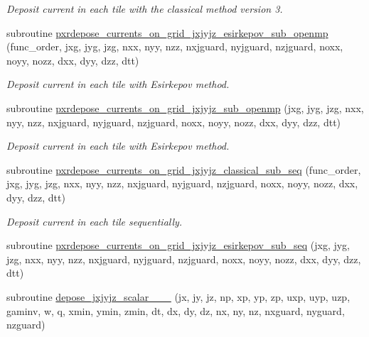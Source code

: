 \begin{DoxyCompactItemize}
\begin{DoxyCompactList}\small\item\em Deposit current in each tile with the classical method version 3. \end{DoxyCompactList}\item 
subroutine \hyperlink{current__deposition_8_f90_ae617423f1f21cbacb686a291c6b0ad7b}{pxrdepose\+\_\+currents\+\_\+on\+\_\+grid\+\_\+jxjyjz\+\_\+esirkepov\+\_\+sub\+\_\+openmp} (func\+\_\+order, jxg, jyg, jzg, nxx, nyy, nzz, nxjguard, nyjguard, nzjguard, noxx, noyy, nozz, dxx, dyy, dzz, dtt)
\begin{DoxyCompactList}\small\item\em Deposit current in each tile with Esirkepov method. \end{DoxyCompactList}\item 
subroutine \hyperlink{current__deposition_8_f90_a7c88c5f1acf180c78f31dfdeb4b80516}{pxrdepose\+\_\+currents\+\_\+on\+\_\+grid\+\_\+jxjyjz\+\_\+sub\+\_\+openmp} (jxg, jyg, jzg, nxx, nyy, nzz, nxjguard, nyjguard, nzjguard, noxx, noyy, nozz, dxx, dyy, dzz, dtt)
\begin{DoxyCompactList}\small\item\em Deposit current in each tile with Esirkepov method. \end{DoxyCompactList}\item 
subroutine \hyperlink{current__deposition_8_f90_a9cba9f74ee775de5a5f60eb97ff619a4}{pxrdepose\+\_\+currents\+\_\+on\+\_\+grid\+\_\+jxjyjz\+\_\+classical\+\_\+sub\+\_\+seq} (func\+\_\+order, jxg, jyg, jzg, nxx, nyy, nzz, nxjguard, nyjguard, nzjguard, noxx, noyy, nozz, dxx, dyy, dzz, dtt)
\begin{DoxyCompactList}\small\item\em Deposit current in each tile sequentially. \end{DoxyCompactList}\item 
subroutine \hyperlink{current__deposition_8_f90_ac4575c491c1cfe9d048c6cb1b6d5fbdb}{pxrdepose\+\_\+currents\+\_\+on\+\_\+grid\+\_\+jxjyjz\+\_\+esirkepov\+\_\+sub\+\_\+seq} (jxg, jyg, jzg, nxx, nyy, nzz, nxjguard, nyjguard, nzjguard, noxx, noyy, nozz, dxx, dyy, dzz, dtt)
\item 
subroutine \hyperlink{current__deposition_8_f90_a7347c7791083dae1b946cdbdce60602f}{depose\+\_\+jxjyjz\+\_\+scalar\+\_\+\_\+\_} (jx, jy, jz, np, xp, yp, zp, uxp, uyp, uzp, gaminv, w, q, xmin, ymin, zmin,                                       dt, dx, dy, dz, nx, ny, nz, nxguard, nyguard, nzguard)
\item 

\end{DoxyCompactItemize}
